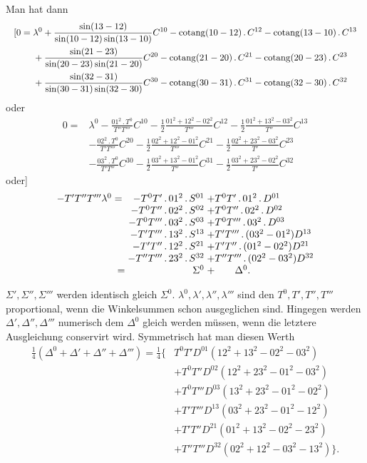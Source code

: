 Man hat dann
\[
\resizebox{\linewidth}{!}{\(\begin{aligned}
 {[}0={}&\lambda^0+\frac{\sin(13-12)}{\sin(10-12)\sin(13-10)}C^{10}
 -\operatorname{cotang}(10-12)\,.\,C^{12}
 -\operatorname{cotang}(13-10)\,.\,C^{13}\\
 &+\frac{\sin(21-23)}{\sin(20-23)\sin(21-20)}C^{20}
 -\operatorname{cotang}(21-20)\,.\,C^{21}
 -\operatorname{cotang}(20-23)\,.\,C^{23}\\
 &+\frac{\sin(32-31)}{\sin(30-31)\sin(32-30)}C^{30}
 -\operatorname{cotang}(30-31)\,.\,C^{31}
 -\operatorname{cotang}(32-30)\,.\,C^{32}
\end{aligned}\)}
\]
\noindent oder
\[
\begin{aligned}
 0={}&\lambda^0-\frac{01^2\,.\,T^0}{T''T'''}C^{10}
 -\tfrac12\frac{01^2+12^2-02^2}{T'''}C^{12}
 -\tfrac12\frac{01^2+13^2-03^2}{T''}C^{13}\\
 &-\frac{02^2\,.\,T^0}{T'T'''}C^{20}
 -\tfrac12\frac{02^2+12^2-01^2}{T'''}C^{21}
 -\tfrac12\frac{02^2+23^2-03^2}{T'}C^{23}\\
 &-\frac{03^2\,.\,T^0}{T'T''}C^{30}
 -\tfrac12\frac{03^2+13^2-01^2}{T''}C^{31}
 -\tfrac12\frac{03^2+23^2-02^2}{T'}C^{32}
\end{aligned}
\]
\noindent oder]
\[
\begin{array}{@{}r@{\;}r@{\;}l@{}}
 -T'T''T'''\lambda^0={}&-T^0T'\,.\,01^2\,.\,S^{01}&+T^0T'\,.\,01^2\,.\,D^{01}\\
 &-T^0T''\,.\,02^2\,.\,S^{02}&+T^0T''\,.\,02^2\,.\,D^{02}\\
 &-T^0T'''\,.\,03^2\,.\,S^{03}&+T^0T'''\,.\,03^2\,.\,D^{03}\\
 &-T'T'''\,.\,13^2\,.\,S^{13}&+T'T'''\,.\,(03^2-01^2)D^{13}\\
 &-T'T''\,.\,12^2\,.\,S^{21}&+T'T''\,.\,(01^2-02^2)D^{21}\\
 &-T''T'''\,.\,23^2\,.\,S^{32}&+T''T'''\,.\,(02^2-03^2)D^{32}\\
 =&\Sigma^0&+\qquad\Delta^0.
\end{array}
\]

\(\Sigma',\Sigma'',\Sigma'''\) werden identisch gleich \(\Sigma^0\). \(\lambda^0,\lambda',\lambda'',\lambda'''\) sind den \(T^0,T',T'',T'''\) proportional, wenn die Winkelsummen schon ausgeglichen sind. Hingegen werden \(\Delta',\Delta'',\Delta'''\) numerisch dem \(\Delta^0\) gleich werden müssen, wenn die letztere Ausgleichung conservirt wird. Symmetrisch hat man diesen Werth
\[
\begin{aligned}
 \tfrac14(\Delta^0+\Delta'+\Delta''+\Delta''')=\tfrac14\bigl\{&
 T^0T'D^{01}(12^2+13^2-02^2-03^2)\\
 &+T^0T''D^{02}(12^2+23^2-01^2-03^2)\\
 &+T^0T'''D^{03}(13^2+23^2-01^2-02^2)\\
 &+T'T'''D^{13}(03^2+23^2-01^2-12^2)\\
 &+T'T''D^{21}(01^2+13^2-02^2-23^2)\\
 &+T''T'''D^{32}(02^2+12^2-03^2-13^2)\bigr\}.
\end{aligned}
\]

